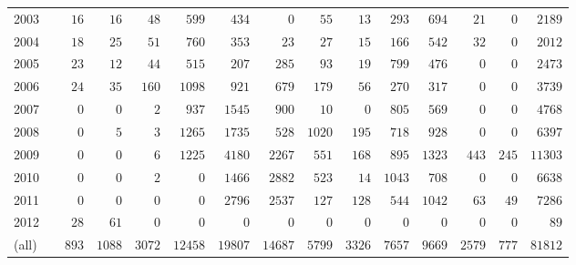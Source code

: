 \begin{table}[!tbp]
\begin{center}
\begin{tabular}{lcrrrrrrrrrrrrr}
2003&&$ 16$&$  16$&$  48$&$  599$&$  434$&$    0$&$  55$&$  13$&$ 293$&$ 694$&$  21$&$  0$&$ 2189$\tabularnewline
2004&&$ 18$&$  25$&$  51$&$  760$&$  353$&$   23$&$  27$&$  15$&$ 166$&$ 542$&$  32$&$  0$&$ 2012$\tabularnewline
2005&&$ 23$&$  12$&$  44$&$  515$&$  207$&$  285$&$  93$&$  19$&$ 799$&$ 476$&$   0$&$  0$&$ 2473$\tabularnewline
2006&&$ 24$&$  35$&$ 160$&$ 1098$&$  921$&$  679$&$ 179$&$  56$&$ 270$&$ 317$&$   0$&$  0$&$ 3739$\tabularnewline
2007&&$  0$&$   0$&$   2$&$  937$&$ 1545$&$  900$&$  10$&$   0$&$ 805$&$ 569$&$   0$&$  0$&$ 4768$\tabularnewline
2008&&$  0$&$   5$&$   3$&$ 1265$&$ 1735$&$  528$&$1020$&$ 195$&$ 718$&$ 928$&$   0$&$  0$&$ 6397$\tabularnewline
2009&&$  0$&$   0$&$   6$&$ 1225$&$ 4180$&$ 2267$&$ 551$&$ 168$&$ 895$&$1323$&$ 443$&$245$&$11303$\tabularnewline
2010&&$  0$&$   0$&$   2$&$    0$&$ 1466$&$ 2882$&$ 523$&$  14$&$1043$&$ 708$&$   0$&$  0$&$ 6638$\tabularnewline
2011&&$  0$&$   0$&$   0$&$    0$&$ 2796$&$ 2537$&$ 127$&$ 128$&$ 544$&$1042$&$  63$&$ 49$&$ 7286$\tabularnewline
2012&&$ 28$&$  61$&$   0$&$    0$&$    0$&$    0$&$   0$&$   0$&$   0$&$   0$&$   0$&$  0$&$   89$\tabularnewline
(all)&&$893$&$1088$&$3072$&$12458$&$19807$&$14687$&$5799$&$3326$&$7657$&$9669$&$2579$&$777$&$81812$\tabularnewline
\hline
\end{tabular}

\end{center}

\end{table}

